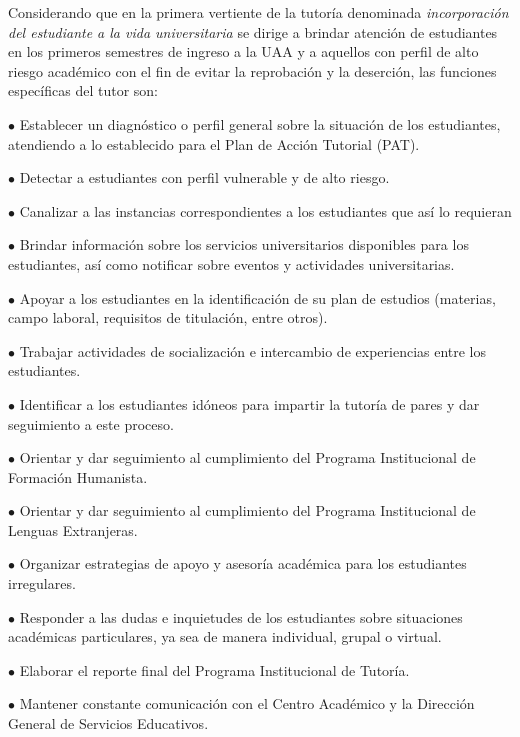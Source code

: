 Considerando que en la primera vertiente de la tutoría denominada
\textit{incorporación del estudiante a la vida universitaria} se dirige a
brindar atención de estudiantes en los primeros semestres de ingreso a la
UAA y a aquellos con perfil de alto riesgo académico con el fin de
evitar la reprobación y la deserción, las funciones específicas del tutor
son:

\enlargethispage{1\baselineskip}
\begin{Obs}
\item[$\bullet$] Establecer un diagnóstico o perfil general sobre la situación de los
estudiantes, atendiendo a lo establecido para el Plan de Acción Tutorial
(PAT).
\item[$\bullet$] Detectar a estudiantes con perfil vulnerable y de alto riesgo.
\item[$\bullet$] Canalizar a las instancias correspondientes a los estudiantes que así lo
requieran
\item[$\bullet$] Brindar información sobre los servicios universitarios disponibles para
los estudiantes, así como notificar sobre eventos y actividades
universitarias.
\item[$\bullet$] Apoyar a los estudiantes en la identificación de su plan de estudios
(materias, campo laboral, requisitos de titulación, entre otros).
\item[$\bullet$] Trabajar actividades de socialización e intercambio de experiencias entre
los estudiantes.
\item[$\bullet$] Identificar a los estudiantes idóneos para impartir la tutoría de pares y
dar seguimiento a este proceso.
\item[$\bullet$] Orientar y dar seguimiento al cumplimiento del Programa Institucional de
Formación Humanista.
\item[$\bullet$] Orientar y dar seguimiento al cumplimiento del Programa Institucional de
Lenguas Extranjeras.
\item[$\bullet$] Organizar estrategias de apoyo y asesoría académica para los estudiantes
irregulares.
\item[$\bullet$] Responder a las dudas e inquietudes de los estudiantes sobre situaciones
académicas particulares, ya sea de manera individual, grupal o virtual.
\item[$\bullet$] Elaborar el reporte final del Programa Institucional de Tutoría.
\item[$\bullet$]Mantener constante comunicación con el Centro Académico y la Dirección
General de Servicios Educativos.
\end{Obs}

